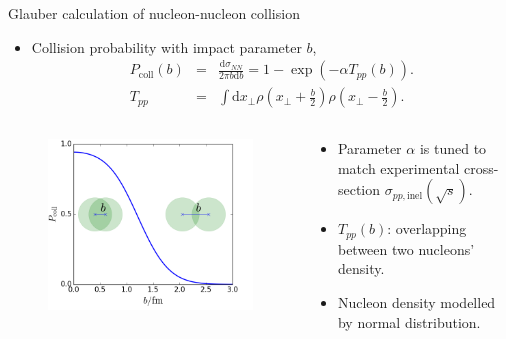 \documentclass[11pt]{beamer}
\begin{document}
\begin{frame}{Glauber calculation of nucleon-nucleon collision}
\begin{itemize}
\item Collision probability with impact parameter $b$,
\begin{eqnarray}\label{dsigma_db}
		P_{\textrm{coll}}(b) &=& \frac{\mathrm{d}\sigma_{NN}}{2\pi b \mathrm{d}b} = 1 - \exp\left(-\alpha T_{pp} (b)\right). \\
		T_{pp} &=& \int \mathrm{d}x_\perp \rho\left(x_\perp + \frac{b}{2}\right) \rho\left(x_\perp - \frac{b}{2}\right).
\end{eqnarray}
\end{itemize}
\begin{columns}[onlytextwidth]
  \begin{column}{0.4\textwidth}
    \begin{figure}
	\begin{center}
	\includegraphics[width = \textwidth]{./pics/Pcoll.png}
	\end{center}
	\end{figure}
  \end{column}
  \begin{column}{0.6\textwidth}
  \begin{itemize}
  	\item Parameter $\alpha$ is tuned to match experimental cross-section $\sigma_{pp, \textrm{inel}}(\sqrt{s})$.
  	\item $T_{pp}(b)$: overlapping between two nucleons' density.
  	\item Nucleon density modelled by normal distribution.
  \end{itemize}
  \end{column}
\end{columns}
\end{frame}
\end{document}
